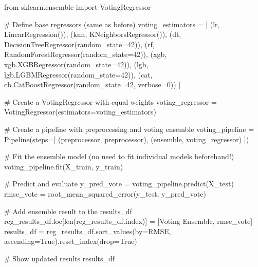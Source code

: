 \documentclass[
  letterpaper,
  DIV=11,
  numbers=noendperiod]{scrreprt}
\newenvironment{Shaded}{\begin{snugshade}}{\end{snugshade}}
\newcommand{\BuiltInTok}[1]{\textcolor[rgb]{0.00,0.23,0.31}{#1}}
\newcommand{\CommentTok}[1]{\textcolor[rgb]{0.37,0.37,0.37}{#1}}
\newcommand{\DecValTok}[1]{\textcolor[rgb]{0.68,0.00,0.00}{#1}}
\newcommand{\ImportTok}[1]{\textcolor[rgb]{0.00,0.46,0.62}{#1}}
\newcommand{\NormalTok}[1]{\textcolor[rgb]{0.00,0.23,0.31}{#1}}
\newcommand{\OperatorTok}[1]{\textcolor[rgb]{0.37,0.37,0.37}{#1}}
\newcommand{\StringTok}[1]{\textcolor[rgb]{0.13,0.47,0.30}{#1}}
\newcommand{\VariableTok}[1]{\textcolor[rgb]{0.07,0.07,0.07}{#1}}
\begin{document}
\begin{Shaded}
\begin{Highlighting}[]
\ImportTok{from}\NormalTok{ sklearn.ensemble }\ImportTok{import}\NormalTok{ VotingRegressor}

\CommentTok{\# Define base regressors (same as before)}
\NormalTok{voting\_estimators }\OperatorTok{=}\NormalTok{ [}
\NormalTok{    (}\StringTok{\textquotesingle{}lr\textquotesingle{}}\NormalTok{, LinearRegression()),}
\NormalTok{    (}\StringTok{\textquotesingle{}knn\textquotesingle{}}\NormalTok{, KNeighborsRegressor()),}
\NormalTok{    (}\StringTok{\textquotesingle{}dt\textquotesingle{}}\NormalTok{, DecisionTreeRegressor(random\_state}\OperatorTok{=}\DecValTok{42}\NormalTok{)),}
\NormalTok{    (}\StringTok{\textquotesingle{}rf\textquotesingle{}}\NormalTok{, RandomForestRegressor(random\_state}\OperatorTok{=}\DecValTok{42}\NormalTok{)),}
\NormalTok{    (}\StringTok{\textquotesingle{}xgb\textquotesingle{}}\NormalTok{, xgb.XGBRegressor(random\_state}\OperatorTok{=}\DecValTok{42}\NormalTok{)),}
\NormalTok{    (}\StringTok{\textquotesingle{}lgb\textquotesingle{}}\NormalTok{, lgb.LGBMRegressor(random\_state}\OperatorTok{=}\DecValTok{42}\NormalTok{)),}
\NormalTok{    (}\StringTok{\textquotesingle{}cat\textquotesingle{}}\NormalTok{, cb.CatBoostRegressor(random\_state}\OperatorTok{=}\DecValTok{42}\NormalTok{, verbose}\OperatorTok{=}\DecValTok{0}\NormalTok{))}
\NormalTok{]}

\CommentTok{\# Create a VotingRegressor with equal weights}
\NormalTok{voting\_regressor }\OperatorTok{=}\NormalTok{ VotingRegressor(estimators}\OperatorTok{=}\NormalTok{voting\_estimators)}

\CommentTok{\# Create a pipeline with preprocessing and voting ensemble}
\NormalTok{voting\_pipeline }\OperatorTok{=}\NormalTok{ Pipeline(steps}\OperatorTok{=}\NormalTok{[}
\NormalTok{    (}\StringTok{\textquotesingle{}preprocessor\textquotesingle{}}\NormalTok{, preprocessor),}
\NormalTok{    (}\StringTok{\textquotesingle{}ensemble\textquotesingle{}}\NormalTok{, voting\_regressor)}
\NormalTok{])}

\CommentTok{\# Fit the ensemble model (no need to fit individual models beforehand!)}
\NormalTok{voting\_pipeline.fit(X\_train, y\_train)}

\CommentTok{\# Predict and evaluate}
\NormalTok{y\_pred\_vote }\OperatorTok{=}\NormalTok{ voting\_pipeline.predict(X\_test)}
\NormalTok{rmse\_vote }\OperatorTok{=}\NormalTok{ root\_mean\_squared\_error(y\_test, y\_pred\_vote)}

\CommentTok{\# Add ensemble result to the results\_df}
\NormalTok{reg\_results\_df.loc[}\BuiltInTok{len}\NormalTok{(reg\_results\_df.index)] }\OperatorTok{=}\NormalTok{ [}\StringTok{\textquotesingle{}Voting Ensemble\textquotesingle{}}\NormalTok{, rmse\_vote]}
\NormalTok{results\_df }\OperatorTok{=}\NormalTok{ reg\_results\_df.sort\_values(by}\OperatorTok{=}\StringTok{\textquotesingle{}RMSE\textquotesingle{}}\NormalTok{, ascending}\OperatorTok{=}\VariableTok{True}\NormalTok{).reset\_index(drop}\OperatorTok{=}\VariableTok{True}\NormalTok{)}

\CommentTok{\# Show updated results}
\NormalTok{results\_df}
\end{Highlighting}
\end{Shaded}
\end{document}

